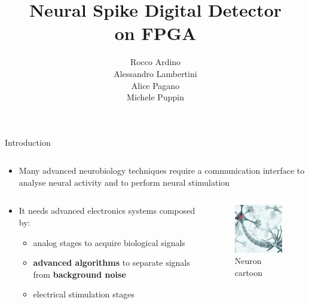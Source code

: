 \documentclass{beamer}
\title{Neural Spike Digital Detector \\on FPGA}
\author{Rocco Ardino\\Alessandro Lambertini\\Alice Pagano\\Michele Puppin}
\date{}
\institute[]
\begin{document}
	
\begin{frame}
    \maketitle
\end{frame}

\begin{frame}{Introduction}
\begin{columns}
    \begin{column}{1.05\textwidth}
        \begin{itemize}
            \item Many advanced neurobiology techniques require a communication interface to analyse neural activity and to perform neural stimulation
        \end{itemize}
    \end{column}
\end{columns}
\begin{columns}
    \begin{column}{0.7\textwidth}
        \begin{itemize}
        	\item It needs advanced electronics systems composed by:
            	\begin{itemize}
            	    \item analog stages to acquire biological signals
            	    \item \textbf{advanced algorithms} to separate signals from \textbf{background noise}
            	    \item electrical stimulation stages
    	        \end{itemize}
            \end{itemize} 
    \end{column}
    \hspace{-0.6cm}
    \begin{column}{0.35\textwidth}
        \begin{figure}
            \vspace{-0.2cm}
            \includegraphics[width=4cm]{neur.jpg}
            \caption{Neuron cartoon}
        \end{figure}
    \end{column}
\end{columns}
\end{frame}
\end{document}
